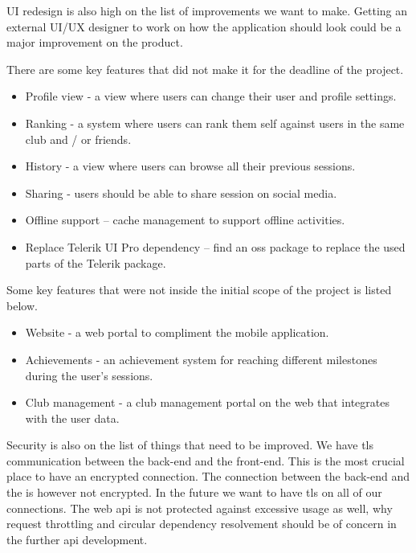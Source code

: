 UI redesign is also high on the list of improvements we want to make.
Getting an external UI/UX designer to work on how the application should look could be a major improvement on the product.

There are some key features that did not make it for the deadline of the project.
\begin{itemize}  
\item Profile view - a view where users can change their user and profile settings.
\item Ranking - a system where users can rank them self against users in the same club and / or friends.
\item History - a view where users can browse all their previous sessions.
\item Sharing - users should be able to share session on social media.
\item Offline support – cache management to support offline activities.
\item Replace Telerik UI Pro dependency – find an \gls{oss} package to replace the used parts of the Telerik package.
\end{itemize}

Some key features that were not inside the initial scope of the project is listed below.
\begin{itemize}  
\item Website - a web portal to compliment the mobile application.
\item Achievements - an achievement system for reaching different milestones during the user’s sessions.
\item Club management - a club management portal on the web that integrates with the user data.
\end{itemize}

Security is also on the list of things that need to be improved. 
We have \gls{tls} communication between the back-end and the front-end. 
This is the most crucial place to have an encrypted connection. 
The connection between the back-end and the  is however not encrypted. 
In the future we want to have \gls{tls} on all of our connections.
The web \gls{api} is not protected against excessive usage as well, why request throttling and circular dependency resolvement should be of concern in the further \gls{api} development. 
